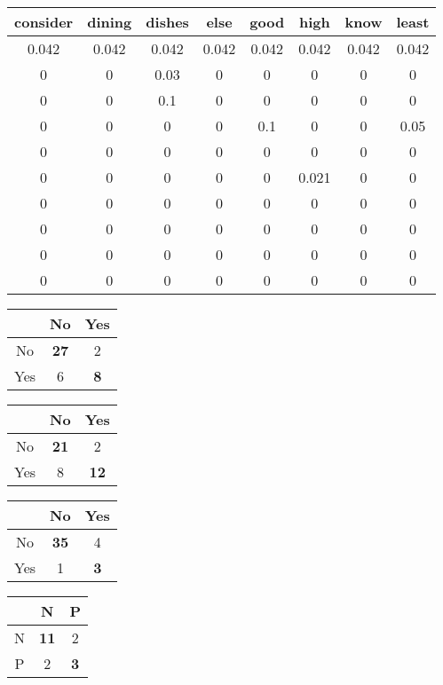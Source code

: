 \documentclass{article}
\begin{document}
\begin{table}
	\centering
	\begin{tabular}{cccccccc}
		consider&dining&dishes&else&good&high&know&least\\\hline
		0.042&0.042&0.042&0.042&0.042&0.042&0.042&0.042\\
		0&0&0.03&0&0&0&0&0\\
		0&0&0.1&0&0&0&0&0\\
		0&0&0&0&0.1&0&0&0.05\\
		0&0&0&0&0&0&0&0\\
		0&0&0&0&0&0.021&0&0\\
		0&0&0&0&0&0&0&0\\
		0&0&0&0&0&0&0&0\\
		0&0&0&0&0&0&0&0\\
		0&0&0&0&0&0&0&0\\\hline
	\end{tabular}
\end{table}

\begin{table}
	\centering
	\begin{tabular}{c|cc}
		&No&Yes\\\hline
		No&\bf{27}&2\\
		Yes&6&\bf{8}\\
	\end{tabular}
\end{table}

\begin{table}
	\centering
	\begin{tabular}{c|cc}
		&No&Yes\\\hline
		No&\bf{21}&2\\
		Yes&8&\bf{12}\\
	\end{tabular}
\end{table}

\begin{table}
	\centering
	\begin{tabular}{c|cc}
		&No&Yes\\\hline
		No&\bf{35}&4\\
		Yes&1&\bf{3}\\
	\end{tabular}
\end{table}

\begin{table}
	\centering
	\begin{tabular}{c|cc}
		&N&P\\\hline
		N&\bf{11}&2\\
		P&2&\bf{3}\\
	\end{tabular}
\end{table}
\end{document}
